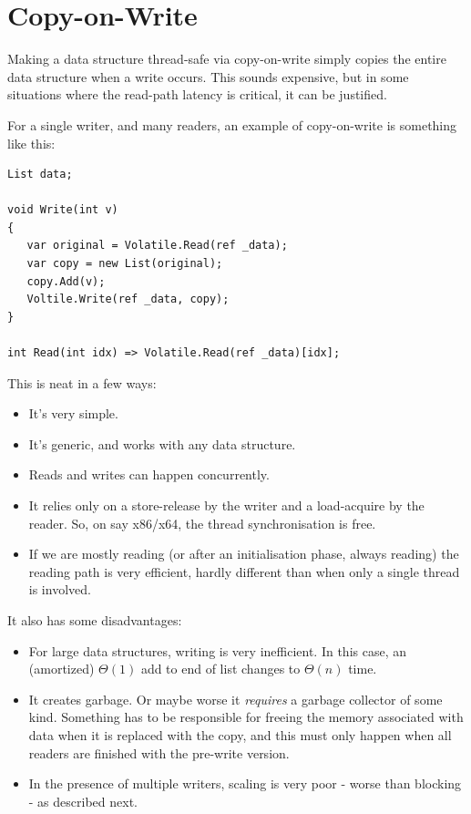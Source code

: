 \documentclass[11pt]{article}
\begin{document}
\section{Copy-on-Write}

Making a data structure thread-safe via copy-on-write simply copies the entire data structure when a write occurs. This sounds expensive, but in some situations where the read-path latency is critical, it can be justified.

For a single writer, and many readers, an example of copy-on-write is something like this:

\begin{lstlisting}
List data;

void Write(int v)
{
   var original = Volatile.Read(ref _data);
   var copy = new List(original);
   copy.Add(v);       
   Voltile.Write(ref _data, copy); 
}

int Read(int idx) => Volatile.Read(ref _data)[idx];
\end{lstlisting}

This is neat in a few ways:
\begin{itemize}
\item It's very simple.
\item It's generic, and works with any data structure.
\item Reads and writes can happen concurrently.
\item It relies only on a store-release by the writer and a load-acquire by the reader. So, on say x86/x64, the thread synchronisation is free.
\item If we are mostly reading (or after an initialisation phase, always reading) the reading path is very efficient, hardly different than when only a single thread is involved.
\end{itemize}

It also has some disadvantages:
\begin{itemize}
\item For large data structures, writing is very inefficient. In this case, an (amortized) $\Theta(1)$ add to end of list changes to $\Theta(n)$ time.
\item It creates garbage. Or maybe worse it \emph{requires} a garbage collector of some kind. Something has to be responsible for freeing the memory associated with data when it is replaced with the copy, and this must only happen when all readers are finished with the pre-write version.
\item In the presence of multiple writers, scaling is very poor - worse than blocking - as described next.
\end{itemize}
\end{document}
